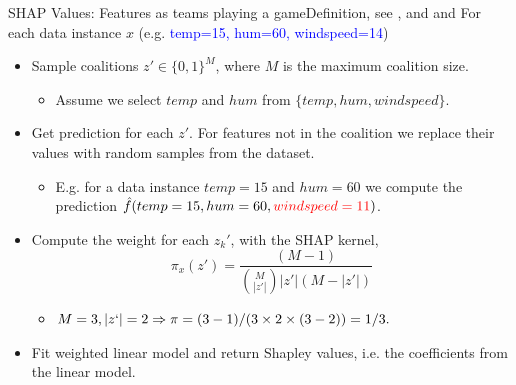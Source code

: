 \documentclass[10pt]{beamer}
\begin{document}
\begin{frame}{SHAP Values: Features as teams playing a game}{Definition, see \cite{NIPS2017_7062}, and \cite[Chapters 5 \& 6]{masis2021} and \cite[Section 9.6]{molnar2019}}
For each data instance $x$ (e.g. \textcolor{blue}{temp=15, hum=60, windspeed=14})
\begin{itemize}
\item Sample coalitions $z'\in\{0, 1\}^{M}$, where $M$ is the maximum coalition size.
\begin{itemize}
\item \color{blue} Assume we select $temp$ and $hum$ from $\{temp, hum, windspeed\}$.
\end{itemize}
\pause
\item Get prediction for each $z'$. For features not in the coalition we replace their values with random samples from the dataset.
\begin{itemize}
\item \color{blue} E.g. for a data instance $temp = 15$ and $hum = 60$ we compute the prediction $\hat{f}(temp=15, hum=60, \textcolor{red}{windspeed=11})$.
\end{itemize}
\pause
\item Compute the weight for each $z_{k}'$, with the SHAP kernel, 
$$\pi_{x}(z') = \frac{(M-1)}{\binom{M}{|z'|}|z'|(M-|z'|)} $$
\begin{itemize}
\item \color{blue} $M=3, |z`|=2 \Rightarrow \pi = (3 - 1)/(3 \times 2\times(3 - 2)) = 1/3.$
\end{itemize}
\pause
\item Fit weighted linear model and  return Shapley values, i.e. the coefficients from the linear model.
\end{itemize}
\end{frame}
\end{document}
